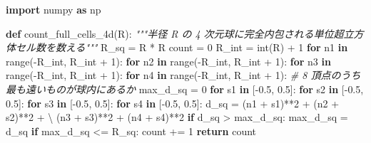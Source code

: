 \documentclass[
]{article}
\newenvironment{Shaded}{}{}
\newcommand{\BuiltInTok}[1]{\textcolor[rgb]{0.00,0.50,0.00}{#1}}
\newcommand{\CommentTok}[1]{\textcolor[rgb]{0.38,0.63,0.69}{\textit{#1}}}
\newcommand{\ControlFlowTok}[1]{\textcolor[rgb]{0.00,0.44,0.13}{\textbf{#1}}}
\newcommand{\DecValTok}[1]{\textcolor[rgb]{0.25,0.63,0.44}{#1}}
\newcommand{\FloatTok}[1]{\textcolor[rgb]{0.25,0.63,0.44}{#1}}
\newcommand{\ImportTok}[1]{\textcolor[rgb]{0.00,0.50,0.00}{\textbf{#1}}}
\newcommand{\KeywordTok}[1]{\textcolor[rgb]{0.00,0.44,0.13}{\textbf{#1}}}
\newcommand{\NormalTok}[1]{#1}
\newcommand{\OperatorTok}[1]{\textcolor[rgb]{0.40,0.40,0.40}{#1}}
\begin{document}
\begin{Shaded}
\begin{Highlighting}[]
\ImportTok{import}\NormalTok{ numpy }\ImportTok{as}\NormalTok{ np}

\KeywordTok{def}\NormalTok{ count\_full\_cells\_4d(R):}
    \CommentTok{"""半径 R の 4 次元球に完全内包される単位超立方体セル数を数える"""}
\NormalTok{    R\_sq }\OperatorTok{=}\NormalTok{ R }\OperatorTok{*}\NormalTok{ R}
\NormalTok{    count }\OperatorTok{=} \DecValTok{0}
\NormalTok{    R\_int }\OperatorTok{=} \BuiltInTok{int}\NormalTok{(R) }\OperatorTok{+} \DecValTok{1}
    \ControlFlowTok{for}\NormalTok{ n1 }\KeywordTok{in} \BuiltInTok{range}\NormalTok{(}\OperatorTok{{-}}\NormalTok{R\_int, R\_int }\OperatorTok{+} \DecValTok{1}\NormalTok{):}
        \ControlFlowTok{for}\NormalTok{ n2 }\KeywordTok{in} \BuiltInTok{range}\NormalTok{(}\OperatorTok{{-}}\NormalTok{R\_int, R\_int }\OperatorTok{+} \DecValTok{1}\NormalTok{):}
            \ControlFlowTok{for}\NormalTok{ n3 }\KeywordTok{in} \BuiltInTok{range}\NormalTok{(}\OperatorTok{{-}}\NormalTok{R\_int, R\_int }\OperatorTok{+} \DecValTok{1}\NormalTok{):}
                \ControlFlowTok{for}\NormalTok{ n4 }\KeywordTok{in} \BuiltInTok{range}\NormalTok{(}\OperatorTok{{-}}\NormalTok{R\_int, R\_int }\OperatorTok{+} \DecValTok{1}\NormalTok{):}
                    \CommentTok{\# 8 頂点のうち最も遠いものが球内にあるか}
\NormalTok{                    max\_d\_sq }\OperatorTok{=} \DecValTok{0}
                    \ControlFlowTok{for}\NormalTok{ s1 }\KeywordTok{in}\NormalTok{ [}\OperatorTok{{-}}\FloatTok{0.5}\NormalTok{, }\FloatTok{0.5}\NormalTok{]:}
                        \ControlFlowTok{for}\NormalTok{ s2 }\KeywordTok{in}\NormalTok{ [}\OperatorTok{{-}}\FloatTok{0.5}\NormalTok{, }\FloatTok{0.5}\NormalTok{]:}
                            \ControlFlowTok{for}\NormalTok{ s3 }\KeywordTok{in}\NormalTok{ [}\OperatorTok{{-}}\FloatTok{0.5}\NormalTok{, }\FloatTok{0.5}\NormalTok{]:}
                                \ControlFlowTok{for}\NormalTok{ s4 }\KeywordTok{in}\NormalTok{ [}\OperatorTok{{-}}\FloatTok{0.5}\NormalTok{, }\FloatTok{0.5}\NormalTok{]:}
\NormalTok{                                    d\_sq }\OperatorTok{=}\NormalTok{ (n1 }\OperatorTok{+}\NormalTok{ s1)}\OperatorTok{**}\DecValTok{2} \OperatorTok{+}\NormalTok{ (n2 }\OperatorTok{+}\NormalTok{ s2)}\OperatorTok{**}\DecValTok{2} \OperatorTok{+} \OperatorTok{\textbackslash{}}
\NormalTok{                                           (n3 }\OperatorTok{+}\NormalTok{ s3)}\OperatorTok{**}\DecValTok{2} \OperatorTok{+}\NormalTok{ (n4 }\OperatorTok{+}\NormalTok{ s4)}\OperatorTok{**}\DecValTok{2}
                                    \ControlFlowTok{if}\NormalTok{ d\_sq }\OperatorTok{\textgreater{}}\NormalTok{ max\_d\_sq:}
\NormalTok{                                        max\_d\_sq }\OperatorTok{=}\NormalTok{ d\_sq}
                    \ControlFlowTok{if}\NormalTok{ max\_d\_sq }\OperatorTok{\textless{}=}\NormalTok{ R\_sq:}
\NormalTok{                        count }\OperatorTok{+=} \DecValTok{1}
    \ControlFlowTok{return}\NormalTok{ count}


\end{Highlighting}
\end{Shaded}
\end{document}
